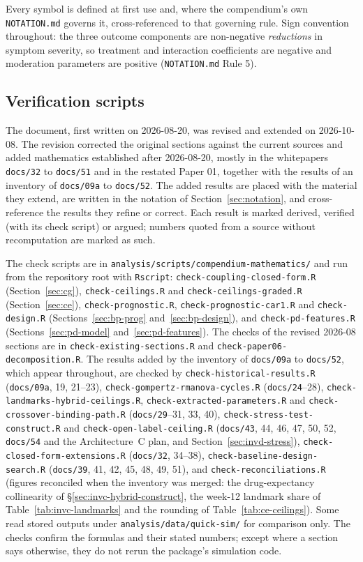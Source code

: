 \documentclass[11pt]{article}
\newcommand{\code}[1]{\texttt{#1}}
\begin{document}
Every symbol is defined at first use and, where the compendium's own
\code{NOTATION.md} governs it, cross-referenced to that governing
rule. Sign convention throughout: the three outcome components are
non-negative \emph{reductions} in symptom severity, so treatment and
interaction coefficients are negative and moderation parameters are
positive (\code{NOTATION.md} Rule 5).

\subsection{Verification scripts}
\label{sec:verification}

The document, first written on 2026-08-20, was revised and extended on
2026-10-08. The revision corrected the original sections against the
current sources and added mathematics established after 2026-08-20,
mostly in the whitepapers \code{docs/32} to \code{docs/51} and in the
restated Paper 01, together with the results of an inventory of
\code{docs/09a} to \code{docs/52}. The added results are placed with
the material they extend, are written in the notation of
Section~\ref{sec:notation}, and cross-reference the results they
refine or correct. Each result is marked derived, verified (with its
check script) or argued; numbers quoted from a source without
recomputation are marked as such.

The check scripts are in \code{analysis/scripts/compendium-mathematics/}
and run from the repository root with \code{Rscript}:
\code{check-coupling-closed-form.R} (Section~\ref{sec:cg}),
\code{check-ceilings.R} and \code{check-ceilings-graded.R}
(Section~\ref{sec:ce}), \code{check-prognostic.R},
\code{check-prognostic-car1.R} and \code{check-design.R}
(Sections~\ref{sec:bp-prog} and~\ref{sec:bp-design}), and
\code{check-pd-features.R} (Sections~\ref{sec:pd-model}
and~\ref{sec:pd-features}). The checks of the revised 2026-08 sections
are in \code{check-existing-sections.R} and
\code{check-paper06-decomposition.R}. The results added by the
inventory of \code{docs/09a} to \code{docs/52}, which appear
throughout, are checked by
\code{check-historical-results.R} (\code{docs/09a}, 19, 21--23),
\code{check-gompertz-rmanova-cycles.R} (\code{docs/24}--28),
\code{check-landmarks-hybrid-ceilings.R},
\code{check-extracted-parameters.R} and
\code{check-crossover-binding-path.R} (\code{docs/29}--31, 33, 40),
\code{check-stress-test-construct.R} and
\code{check-open-label-ceiling.R} (\code{docs/43}, 44, 46, 47, 50, 52,
\code{docs/54} and the Architecture~C plan, and
Section~\ref{sec:invd-stress}),
\code{check-closed-form-extensions.R} (\code{docs/32}, 34--38),
\code{check-baseline-design-search.R} (\code{docs/39}, 41, 42, 45, 48,
49, 51), and \code{check-reconciliations.R} (figures reconciled when
the inventory was merged: the drug-expectancy collinearity of
\S\ref{sec:invc-hybrid-construct}, the week-12 landmark share of
Table~\ref{tab:invc-landmarks} and the rounding of
Table~\ref{tab:ce-ceilings}). Some read stored
outputs under \code{analysis/data/quick-sim/} for comparison only. The
checks confirm the formulas and their stated numbers; except where a
section says otherwise, they do not rerun the package's simulation
code.
\end{document}
